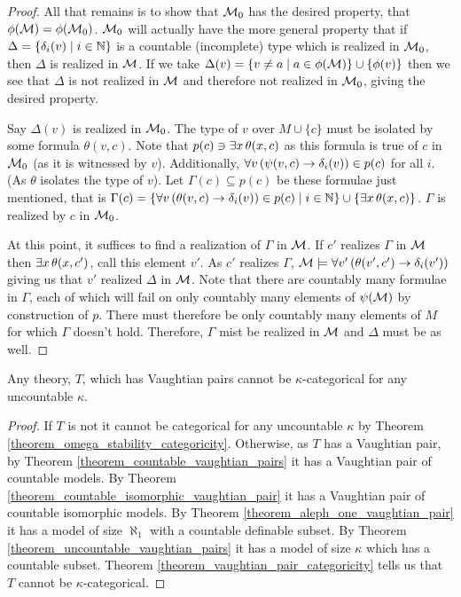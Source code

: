 \begin{proof}
All that remains is to show that \(\mathcal{M}_0\) has the desired property, that \(\phi(\mathcal{M}) = \phi(\mathcal{M}_0)\).   
\(\mathcal{M}_0\) will actually have the more general property that if \(\Delta = \{\delta_i(v)\mid i \in \mathbb{N}\}\) is a countable (incomplete) type which is realized in \(\mathcal{M}_0\), then \(\Delta\) is realized in \(\mathcal{M}\).
If we take \(\Delta(v) = \{v \neq a \mid a \in \phi(\mathcal{M})\} \cup \{\phi(v)\}\) then we see that \(\Delta\) is not realized in \(\mathcal{M}\) and therefore not realized in \(\mathcal{M}_0\), giving the desired property. 

Say \(\Delta(v)\) is realized in \(\mathcal{M}_0\).
The type of \(v\) over \(M \cup \{c\}\) must be isolated by some formula \(\theta(v, c)\). %
Note that \(p(c) \ni \exists x \, \theta(x, c)\) as this formula is true of \(c\) in \(\mathcal{M}_0\) (as it is witnessed by \(v\)).
Additionally, \(\forall v \, (\psi(v, c) \to \delta_i(v)) \in p(c)\) for all \(i\). (As \(\theta\) isolates the type of \(v\)). 
Let \(\Gamma(c) \subseteq p(c)\) be these formulae just mentioned, that is \(\Gamma(c) = \{\forall v \,(\theta(v, c) \to \delta_i(v)) \in p(c) \mid i \in \mathbb{N}\} \cup \{\exists x \, \theta(x, c)\}\). 
\(\Gamma\) is realized by \(c\) in \(\mathcal{M}_0\). 

At this point, it suffices to find a realization of \(\Gamma\) in \(\mathcal{M}\).
If \(c'\) realizes \(\Gamma\) in \(\mathcal{M}\) then \(\exists x \, \theta(x, c')\), call this element \(v'\). 
As \(c'\) realizes \(\Gamma\), \(\mathcal{M} \models \forall v' \,(\theta(v', c') \to \delta_i(v'))\) giving us that \(v'\) realized \(\Delta\) in \(\mathcal{M}\). 
Note that there are countably many formulae in \(\Gamma\), each of which will fail on only countably many elements of \(\psi(\mathcal{M})\) by construction of \(p\). 
There must therefore be only countably many elements of \(M\) for which \(\Gamma\) doesn't hold. 
Therefore, \(\Gamma\) mist be realized in \(\mathcal{M}\) and \(\Delta\) must be as well. 
\end{proof}

\begin{theorem}\label{theorem_vaughtian_pairs_categoricity}
Any theory, \(T\), which has Vaughtian pairs cannot be \(\kappa\)-categorical for any uncountable \(\kappa\).
\end{theorem}

\begin{proof}
If \(T\) is not \omst it cannot be categorical for any uncountable \(\kappa\) by Theorem \ref{theorem_omega_stability_categoricity}.
Otherwise, as \(T\) has a Vaughtian pair, by Theorem \ref{theorem_countable_vaughtian_pairs} it has a Vaughtian pair of countable models. 
By Theorem \ref{theorem_countable_isomorphic_vaughtian_pair} it has a Vaughtian pair of countable isomorphic models.
By Theorem \ref{theorem_aleph_one_vaughtian_pair} it has a model of size \(\aleph_1\) with a countable definable subset. 
By Theorem \ref{theorem_uncountable_vaughtian_pairs} it has a model of size \(\kappa\) which has a countable subset.  
Theorem \ref{theorem_vaughtian_pair_categoricity} tells us that \(T\) cannot be \(\kappa\)-categorical. 
\end{proof}

